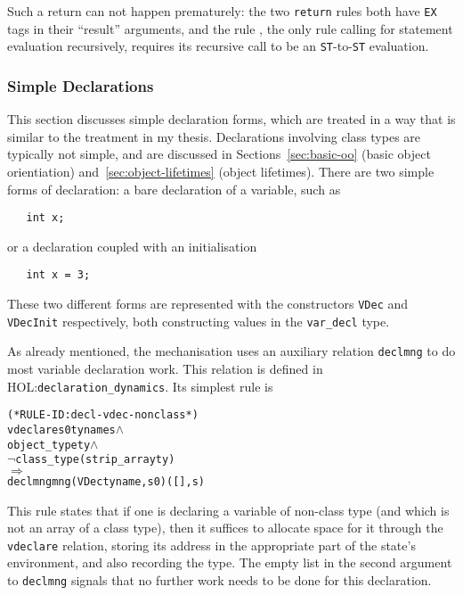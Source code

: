 \documentclass[11pt]{article}
\newcommand{\HOLfile}[1]{HOL:\texttt{#1}}
\begin{document}
Such a return can not happen prematurely: the two \texttt{return}
rules both have \texttt{EX} tags in their ``result'' arguments, and
the rule , the only rule calling for
statement evaluation recursively, requires its recursive call to be an
\texttt{ST}-to-\texttt{ST} evaluation.

\subsubsection{Simple Declarations}
\label{sec:simple-declarations}

This section discusses simple declaration forms, which are treated in
a way that is similar to the treatment in my thesis.  Declarations
involving class types are typically not simple, and are discussed in
Sections~\ref{sec:basic-oo} (basic object orientiation)
and~\ref{sec:object-lifetimes} (object lifetimes). There are two
simple forms of declaration: a bare declaration of a variable, such as
\begin{verbatim}
   int x;
\end{verbatim}
or a declaration coupled with an initialisation
\begin{verbatim}
   int x = 3;
\end{verbatim}
  These
two different forms are represented with the constructors
\texttt{VDec} and \texttt{VDecInit} respectively, both constructing
values in the \texttt{var_decl} type.

%
As already mentioned, the \cpp{} mechanisation uses an auxiliary
relation \texttt{declmng} to do most variable declaration work.  This
relation is defined in \HOLfile{declaration_dynamics}.  Its simplest
rule is 
\begin{center}
\begin{minipage}{\textwidth}
%
\begin{alltt}
(* RULE-ID: decl-vdec-nonclass *)
     vdeclare s0 ty name s \(\land\)
     object_type ty \(\land\)
     \(\neg\)class_type (strip_array ty)
   \(\Rightarrow\)
     declmng mng (VDec ty name, s0) ([], s)
\end{alltt}
  \end{minipage}
\end{center}
This rule states that if one is declaring a variable of non-class type
(and which is not an array of a class type), then it suffices to
allocate space for it through the \texttt{vdeclare} relation, storing
its address in the appropriate part of the state's environment, and
also recording the type.  The empty list in the second argument to
\texttt{declmng} signals that no further work needs to be done for
this declaration.
\end{document}
